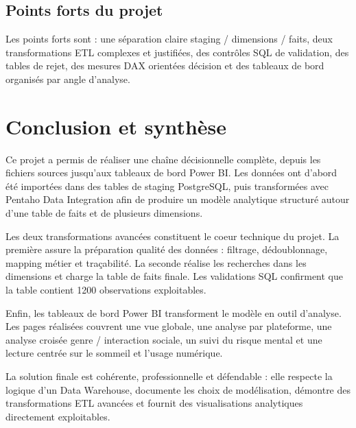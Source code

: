 \documentclass[11pt,a4paper]{report}
\newcommand{\db}[1]{\begingroup\ttfamily\scriptsize\detokenize{#1}\endgroup}
\begin{document}
\section{Points forts du projet}

\begin{notebox}
Les points forts sont : une séparation claire staging / dimensions / faits, deux transformations ETL complexes et justifiées, des contrôles SQL de validation, des tables de rejet, des mesures DAX orientées décision et des tableaux de bord organisés par angle d'analyse.
\end{notebox}

\chapter*{Conclusion et synthèse}

Ce projet a permis de réaliser une chaîne décisionnelle complète, depuis les fichiers sources jusqu'aux tableaux de bord Power BI. Les données ont d'abord été importées dans des tables de staging PostgreSQL, puis transformées avec Pentaho Data Integration afin de produire un modèle analytique structuré autour d'une table de faits et de plusieurs dimensions.

Les deux transformations avancées constituent le coeur technique du projet. La première assure la préparation qualité des données : filtrage, dédoublonnage, mapping métier et traçabilité. La seconde réalise les recherches dans les dimensions et charge la table de faits finale. Les validations SQL confirment que la table \db{fait_sante_mentale} contient 1200 observations exploitables.

Enfin, les tableaux de bord Power BI transforment le modèle en outil d'analyse. Les pages réalisées couvrent une vue globale, une analyse par plateforme, une analyse croisée genre / interaction sociale, un suivi du risque mental et une lecture centrée sur le sommeil et l'usage numérique.

\begin{resultbox}
La solution finale est cohérente, professionnelle et défendable : elle respecte la logique d'un Data Warehouse, documente les choix de modélisation, démontre des transformations ETL avancées et fournit des visualisations analytiques directement exploitables.
\end{resultbox}

\appendix
\end{document}
